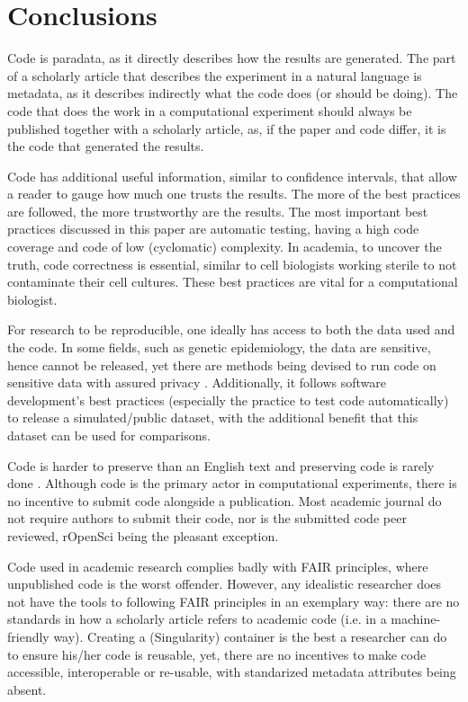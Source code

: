 \section{Conclusions}

Code is paradata, as it directly describes how the results are generated.
The part of a scholarly article 
that describes the experiment in a natural language is metadata, 
as it describes indirectly what the code does (or should be doing).
The code that does the work in a computational experiment should
always be published together with a scholarly article,
as, if the paper and code differ, it is the code that generated the results.

Code has additional useful information, similar to confidence intervals,
that allow a reader to gauge how much one trusts the results.
The more of the best practices are followed, 
the more trustworthy are the results.
The most important best practices discussed in this paper are
automatic testing, having a high code coverage and code
of low (cyclomatic) complexity.
In academia, to uncover the truth, code correctness is essential,
similar to cell biologists working sterile to not contaminate their
cell cultures.
These best practices are vital for a computational biologist.

For research to be reproducible, one ideally has access to
both the data used and the code.
In some fields, such as genetic epidemiology, the data are
sensitive, hence cannot be released,
yet there are methods being devised to run code on sensitive
data with assured privacy \cite{zhang2016review,azencott2018machine}.
Additionally, it follows software development's best practices 
(especially the practice to test code automatically) 
to release a simulated/public dataset, with
the additional benefit that this dataset can be used for comparisons.

Code is harder to preserve than an English text
and preserving code is rarely done \cite{barnes2010publish}.
Although code is the primary actor in computational experiments,
there is no incentive to submit code alongside a publication.
Most academic journal do not require authors to submit their code,
nor is the submitted code peer reviewed, 
rOpenSci \cite{ram2018community} being the pleasant exception.

Code used in academic research complies badly with FAIR principles,
where unpublished code is the worst offender.
However, any idealistic researcher does not have the
tools to following FAIR principles in an exemplary way:
there are no standards in how a scholarly article
refers to academic code (i.e. in a machine-friendly way).
Creating a (Singularity) container is the best a researcher
can do to ensure his/her code is reusable,
yet, there are no incentives to make code accessible, interoperable
or re-usable, with standarized metadata attributes being absent.

